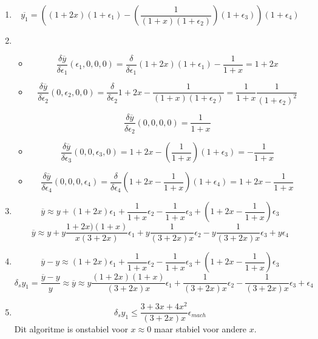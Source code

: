 \documentclass[12pt,a4paper]{article}
\begin{document}
\begin{enumerate}
\item
\[
\overline{y_1} = \left((1+2x)(1+\epsilon_1)-\left(\frac{1}{(1+x)(1+\epsilon_2)}\right)(1+\epsilon_3)\right)(1+\epsilon_4)
\]
\item
\begin{itemize}
\item
\[
\frac{\delta\overline{y}}{\delta\epsilon_1}(\epsilon_1,0,0,0)
= \frac{\delta}{\delta\epsilon_1}(1+2x)(1+\epsilon_1)-\frac{1}{1+x}
= 1+2x
\]

\item
\[
\frac{\delta\overline{y}}{\delta\epsilon_2}(0,\epsilon_2,0,0)
= \frac{\delta}{\delta\epsilon_2}1+2x-\frac{1}{(1+x)(1+\epsilon_2)}=\frac{1}{1+x}\frac{1}{(1+\epsilon_2)^2}
\]

\[
\frac{\delta\overline{y}}{\delta\epsilon_2}(0,0,0,0)
= \frac{1}{1+x}
\]

\item
\[
\frac{\delta\overline{y}}{\delta\epsilon_3}(0,0,\epsilon_3,0)
= 1+2x-(\frac{1}{1+x})(1+\epsilon_3)
= -\frac{1}{1+x}
\]

\item
\[
\frac{\delta\overline{y}}{\delta\epsilon_4}(0,0,0,\epsilon_4)
= \frac{\delta}{\delta\epsilon_4}(1+2x-\frac{1}{1+x})(1+\epsilon_4)
= 1+2x-\frac{1}{1+x}
\]

\end{itemize}

\item
\[
\overline{y} \approx y
+ (1+2x)\epsilon_1
+ \frac{1}{1+x}\epsilon_2
- \frac{1}{1+x}\epsilon_3
+ \left(1+2x-\frac{1}{1+x}\right)\epsilon_3
\]
\[
\overline{y} \approx y
+ y\frac{1+2x)(1+x)}{x(3+2x)}\epsilon_1
+ y\frac{1}{(3+2x)x}\epsilon_2
- y\frac{1}{(3+2x)x}\epsilon_3
+ y\epsilon_4
\]

\item
\[
\overline{y} - y
\approx
  (1+2x)\epsilon_1
+ \frac{1}{1+x}\epsilon_2
- \frac{1}{1+x}\epsilon_3
+ \left(1+2x-\frac{1}{1+x}\right)\epsilon_3
\]
\[
\delta_{s}y_1 =
\frac{\overline{y} - y}{y}
\approx
\overline{y} \approx y
  \frac{(1+2x)(1+x)}{(3+2x)x}\epsilon_1
+ \frac{1}{(3+2x)x}\epsilon_2
- \frac{1}{(3+2x)x}\epsilon_3
+ \epsilon_4
\]
\item
\[
\delta_{s}y_1 \le  \frac{3+3x+4x^2}{(3+2x)x}\epsilon_{mach}
\]
Dit algoritme is onstabiel voor $x\approx 0$ maar stabiel voor andere $x$.

\end{enumerate}
\end{document}
